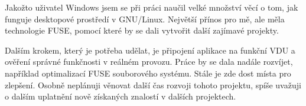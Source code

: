 Jakožto uživatel Windows jsem se při práci naučil velké množství věcí o tom, jak funguje desktopové prostředí v GNU/Linux. Největší přínos pro mě, ale měla
technologie FUSE, pomocí které by se dali vytvořit další zajímavé projekty.

Dalším krokem, který je potřeba udělat, je připojení aplikace na funkční VDU a ověření správné funkčnosti v reálném provozu. Práce by se dala nadále
rozvíjet, například optimalizací FUSE souborového systému. Stále je zde dost místa pro zlepšení. Osobně neplánuji věnovat další čas rozvoji tohoto projektu, 
spíše uvažuji o dalším uplatnění nově získaných znalostí v dalších projektech.